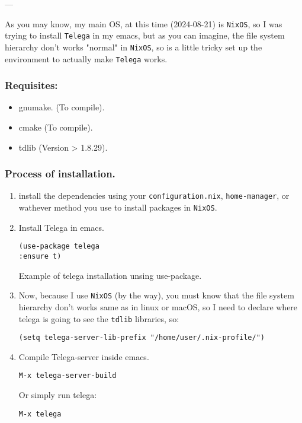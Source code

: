 \documentclass[11pt]{article}
\begin{document}
---

As you may know, my main OS, at this time (2024-08-21) is \texttt{NixOS}, so I was trying to install \texttt{Telega} in my emacs, but as you can imagine, the file system hierarchy don't works "normal" in \texttt{NixOS}, so is a little tricky set up the environment to actually make \texttt{Telega} works.
\subsubsection{Requisites:}
\label{sec:orge61b678}
\begin{itemize}
\item gnumake. (To compile).
\item cmake (To compile).
\item tdlib (Version > 1.8.29).
\end{itemize}
\subsubsection{Process of installation.}
\label{sec:org5b3888c}
\begin{enumerate}
\item install the dependencies using your \texttt{configuration.nix}, \texttt{home-manager}, or wathever method you use to install packages in \texttt{NixOS}.
\item Install Telega in emacs.
\begin{listing}[htbp]
\begin{verbatim}
(use-package telega
:ensure t)
\end{verbatim}
\caption{Example of telega installation unsing use-package.}
\end{listing}
\item Now, because I use \texttt{NixOS} (by the way), you must know that the file system hierarchy don't works same as in linux or macOS, so I need to declare where telega is going to see the \texttt{tdlib} libraries, so:
\begin{verbatim}
(setq telega-server-lib-prefix "/home/user/.nix-profile/")
\end{verbatim}
\item Compile Telega-server inside emacs.
\begin{verbatim}
M-x telega-server-build
\end{verbatim}

Or simply run telega:
\begin{verbatim}
M-x telega
\end{verbatim}
\end{enumerate}
\end{document}
